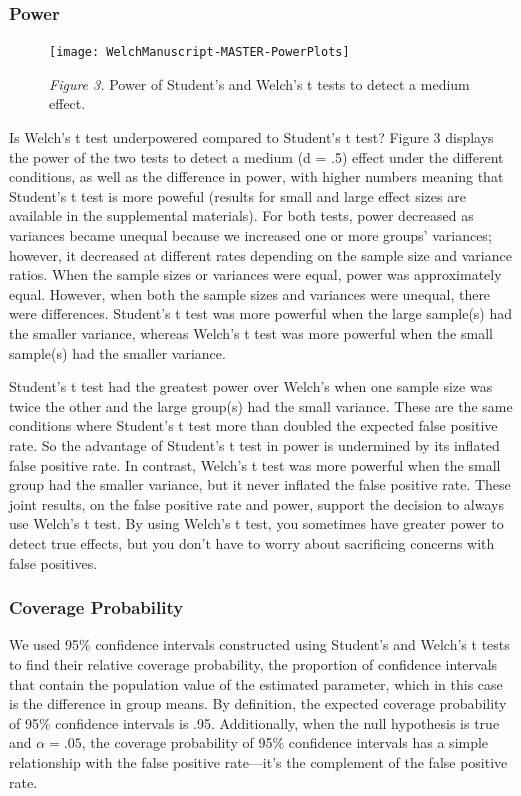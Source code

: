 \documentclass[man, noextraspace, apacite, floatsintext]{apa6}
\begin{document}
\subsubsection{Power}



\begin{figure}[!ht]
\texttt{[image: WelchManuscript-MASTER-PowerPlots]}

\textit{Figure 3.} Power of Student's and Welch's t tests to detect a medium effect.
\end{figure}

    Is Welch's t test underpowered compared to Student's t test? Figure 3 
displays the power of the two tests to detect a medium (d = .5) effect
under the different conditions, as well as the difference in power, with higher numbers meaning that Student's t test is more poweful (results for small and large effect sizes are available in the supplemental materials). For both tests, power decreased as variances 
became unequal because we increased one or more groups' variances; however, 
it decreased at different rates depending on the sample size and 
variance ratios. When the sample sizes or variances were equal, power was approximately equal. However, when both the sample sizes and 
variances were unequal, there were differences. Student's t 
test was more powerful when the large sample(s) had the smaller variance, whereas 
Welch's t test was more powerful when the small sample(s) had the smaller variance. 
    
    Student's t test had the greatest power over 
Welch's when one sample size was twice the other and the large 
group(s) had the small variance. These are the same conditions where Student's t 
test more than doubled the expected false positive rate. So the advantage of Student's t test
in power is undermined by its inflated false 
positive rate. In contrast, Welch's t test was more 
powerful when the small group had the smaller variance, but it never inflated the false positive rate. 
These joint results, on the false positive rate and power, support the decision to always use Welch's t test. By using 
Welch's t test, you sometimes have greater power to detect true effects, but 
you don't have to worry about sacrificing concerns with false positives.  


\subsubsection{Coverage Probability}
We used 95\% confidence intervals constructed using Student's and Welch's t 
tests to find their relative coverage probability, the proportion of confidence intervals 
that contain the population value of the estimated parameter, which in this case is the 
difference in group means. By 
definition,  the expected coverage probability of 95\% confidence intervals  is .95. 
Additionally, when the null hypothesis is true and $\alpha = .05$, the coverage 
probability of 95\% confidence intervals has a simple relationship with the 
false positive rate---it's the complement of the false positive rate. 
\end{document}
